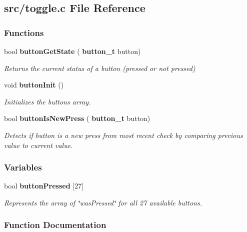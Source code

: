 \subsection{src/toggle.c File Reference}
\label{toggle_8c}
\subsubsection*{Functions}
\begin{DoxyCompactItemize}
\item 
bool \textbf{ button\+Get\+State} (\textbf{ button\+\_\+t} button)
\begin{DoxyCompactList}\small\item\em Returns the current status of a button (pressed or not pressed) \end{DoxyCompactList}\item 
void \textbf{ button\+Init} ()
\begin{DoxyCompactList}\small\item\em Initializes the buttons array. \end{DoxyCompactList}\item 
bool \textbf{ button\+Is\+New\+Press} (\textbf{ button\+\_\+t} button)
\begin{DoxyCompactList}\small\item\em Detects if button is a new press from most recent check by comparing previous value to current value. \end{DoxyCompactList}\end{DoxyCompactItemize}
\subsubsection*{Variables}
\begin{DoxyCompactItemize}
\item 
bool \textbf{ button\+Pressed} [27]
\begin{DoxyCompactList}\small\item\em Represents the array of \char`\"{}was\+Pressed\char`\"{} for all 27 available buttons. \end{DoxyCompactList}\end{DoxyCompactItemize}


\subsubsection{Function Documentation}
\mbox{\label{toggle_8c_ad2b7c969a01f85d57bdca0bc7f5cff81}} 
